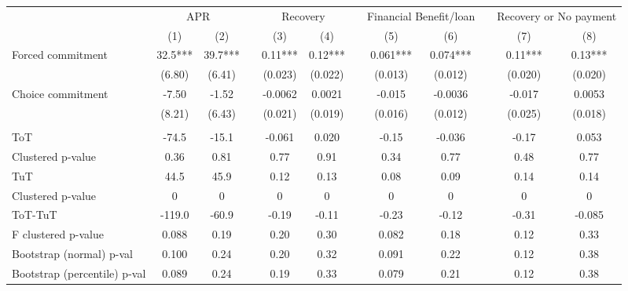 \begin{tabular}{lccccccccccc}
\toprule
      & \multicolumn{2}{c}{APR} &       & \multicolumn{2}{c}{Recovery} &       & \multicolumn{2}{c}{Financial Benefit/loan} &       & \multicolumn{2}{c}{Recovery or No payment} \\
\cmidrule{2-3}\cmidrule{5-6}\cmidrule{8-9}\cmidrule{11-12}      & (1)   & (2)   &       & (3)   & (4)   &       & (5)   & (6)   &       & (7)   & (8) \\
\midrule
\midrule
Forced commitment & 32.5*** & 39.7*** &       & 0.11*** & 0.12*** &       & 0.061*** & 0.074*** &       & 0.11*** & 0.13*** \\
      & (6.80) & (6.41) &       & (0.023) & (0.022) &       & (0.013) & (0.012) &       & (0.020) & (0.020) \\
Choice commitment & -7.50 & -1.52 &       & -0.0062 & 0.0021 &       & -0.015 & -0.0036 &       & -0.017 & 0.0053 \\
      & (8.21) & (6.43) &       & (0.021) & (0.019) &       & (0.016) & (0.012) &       & (0.025) & (0.018) \\
      &       &       &       &       &       &       &       &       &       &       &  \\
\midrule
\rowcolor[rgb]{ .949,  .949,  .949} ToT   & -74.5 & -15.1 &       & -0.061 & 0.020 &       & -0.15 & -0.036 &       & -0.17 & 0.053 \\
Clustered p-value & 0.36  & 0.81  &       & 0.77  & 0.91  &       & 0.34  & 0.77  &       & 0.48  & 0.77 \\
\rowcolor[rgb]{ .949,  .949,  .949} TuT   & 44.5  & 45.9  &       & 0.12  & 0.13  &       & 0.08  & 0.09  &       & 0.14  & 0.14 \\
Clustered p-value & 0     & 0     &       & 0     & 0     &       & 0     & 0     &       & 0     & 0 \\
\rowcolor[rgb]{ .949,  .949,  .949} ToT-TuT & -119.0 & -60.9 &       & -0.19 & -0.11 &       & -0.23 & -0.12 &       & -0.31 & -0.085 \\
F clustered p-value & 0.088 & 0.19  &       & 0.20  & 0.30  &       & 0.082 & 0.18  &       & 0.12  & 0.33 \\
Bootstrap (normal) p-val & 0.100 & 0.24  &       & 0.20  & 0.32  &       & 0.091 & 0.22  &       & 0.12  & 0.38 \\
Bootstrap (percentile) p-val & 0.089 & 0.24  &       & 0.19  & 0.33  &       & 0.079 & 0.21  &       & 0.12  & 0.38 \\

\end{tabular}
